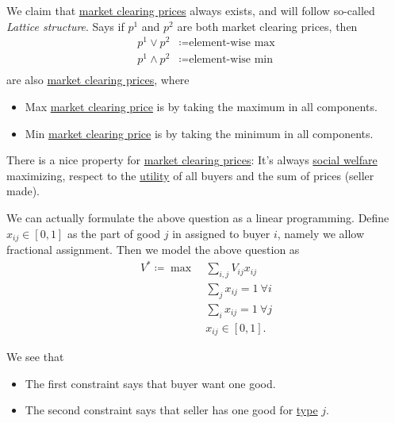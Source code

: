 We claim that \hyperref[note:market-clearing-prices]{market clearing prices} always exists, and will follow so-called \emph{Lattice structure}. Says if \(p^{1}\) and \(p^{2}\) are both market clearing prices, then
\[
	\begin{split}
		p^{1}\lor p^{2}  & \coloneqq \text{element-wise max} \\
		p^{1}\land p^{2} & \coloneqq \text{element-wise min} \\
	\end{split}
\]
are also \hyperref[note:market-clearing-prices]{market clearing prices}, where
\begin{itemize}
	\item Max \hyperref[note:market-clearing-prices]{market clearing price} is by taking the maximum in all components.
	\item Min \hyperref[note:market-clearing-prices]{market clearing price} is by taking the minimum in all components.
\end{itemize}

\begin{remark}
	There is a nice property for \hyperref[note:market-clearing-prices]{market clearing prices}: It's always \hyperref[def:social-welfare]{social welfare}
	maximizing, respect to the \hyperref[def:reward]{utility} of all buyers and the sum of prices (seller made).
\end{remark}

We can actually formulate the above question as a linear programming. Define \(x_{ij} \in [0, 1]\) as the part of good \(j\) in assigned to buyer \(i\), namely we allow fractional assignment. Then we model the above question as
\[
	\begin{aligned}
		V^{\ast} \coloneqq \max~ & \sum\limits_{i, j}V_{ij}x_{ij}       \\
		                         & \sum\limits_{j}x_{ij} = 1\ \forall i \\
		                         & \sum\limits_{i}x_{ij} = 1\ \forall j \\
		                         & x_{ij}\in[0, 1].
	\end{aligned}
\]
\begin{intuition}
	We see that
	\begin{itemize}
		\item The first constraint says that buyer want one good.
		\item The second constraint says that seller has one good for \hyperref[def:type]{type} \(j\).
	\end{itemize}
\end{intuition}

